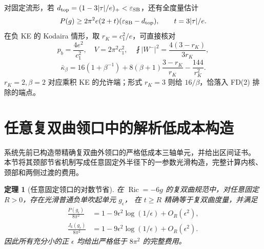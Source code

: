 \documentclass[UTF8,11pt,a4paper,fontset=none]{ctexart}
\numberwithin{equation}{section}
\newtheorem{theorem}{定理}[section]
\theoremstyle{definition}
\theoremstyle{remark}\newtheorem{remark}[theorem]{说明}
\newcommand{\Ric}{\operatorname{Ric}}
\newcommand{\avint}{\fint}
\begin{document}
对固定流形，若 $d_{\rm top}=(1-3|\tau|/e)_+<\varepsilon_{\rm SB}$，还有全度量估计
\[
P(g)\ge2\pi^2e(2+t)(\varepsilon_{\rm SB}-d_{\rm top}),\qquad t=3|\tau|/e.
\]
在负 KE 的 Kodaira 情形，取 $r_K=c_1^2/e$，可直接核对
\[
p_b=\frac{4e^2}{c_1^2},\quad V=2\pi^2c_1^2,\quad
\avint|W^-|^2=\frac{4(3-r_K)}{3r_K},
\]
\[
\bar\kappa_\beta=16(1+\beta^{-1})
+8(\beta+1)\frac{3-r_K}{r_K}-\frac{144}{r_K^2}.
\]
$r_K=2,\beta=2$ 对应乘积 KE 的允许端；形式 $r_K=3$ 则给 $16/\beta$，恰落入 FD(2) 排除的端点。

\section{任意复双曲领口中的解析低成本构造}\label{sec:collar}

系统先前已构造带精确复双曲外领口的严格低成本三轴单元，并给出区间证书\cite{System}。
本节将其颈部节省机制写成任意固定外半径下的一参数光滑构造，完整计算内核、颈部和两侧过渡的费用。

\begin{theorem}[任意固定领口的对数节省]\label{thm:cell}
在 $\Ric=-6g$ 的复双曲规范中，对任意固定 $R>0$，存在光滑普通负单吹起单元 $g_\epsilon$，
在 $t\ge R$ 精确等于复双曲度量，并满足
\begin{align}
\frac{P(g_\epsilon)}{8\pi^2}
&=1-9\epsilon^2\log(1/\epsilon)+O_R(\epsilon^2),\label{eq:cell-P}\\
\frac{J_6(g_\epsilon)}{8\pi^2}
&=1-9\epsilon^2\log(1/\epsilon)+O_R(\epsilon^2).
\label{eq:cell-J}
\end{align}
因此所有充分小的正 $\epsilon$ 均给出严格低于 $8\pi^2$ 的完整费用。
\end{theorem}
\end{document}
